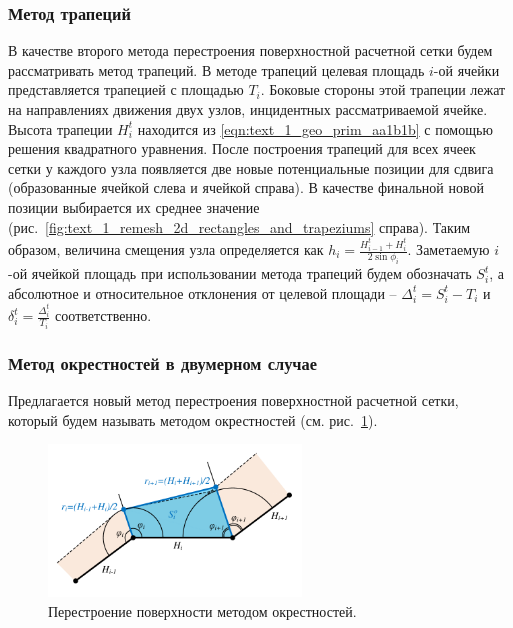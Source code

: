 \subsubsection{Метод трапеций}

В качестве второго метода перестроения поверхностной расчетной сетки будем рассматривать метод трапеций.
В методе трапеций целевая площадь $i$-ой ячейки представляется трапецией с площадью $T_i$.
Боковые стороны этой трапеции лежат на направлениях движения двух узлов, инцидентных рассматриваемой ячейке.
Высота трапеции $H_i^t$ находится из \eqref{eqn:text_1_geo_prim_aa1b1b} с помощью решения квадратного уравнения.
После построения трапеций для всех ячеек сетки у каждого узла появляется две новые потенциальные позиции для сдвига (образованные ячейкой слева и ячейкой справа).
В качестве финальной новой позиции выбирается их среднее значение (рис.~\ref{fig:text_1_remesh_2d_rectangles_and_trapeziums} справа).
Таким образом, величина смещения узла определяется как $h_i = \frac{H_{i - 1}^t + H_i^t}{2 \sin \phi_i}$.
Заметаемую $i$-ой ячейкой площадь при использовании метода трапеций будем обозначать $S_i^t$, а абсолютное и относительное отклонения от целевой площади -- $\Delta_i^t = S_i^t - T_i$ и $\delta_i^t = \frac{\Delta_i^t}{T_i}$ соответственно.

\subsubsection{Метод окрестностей в двумерном случае}\label{sec:2dr_okrestnost_method}

Предлагается новый метод перестроения поверхностной расчетной сетки, который будем называть методом окрестностей (см. рис.~\ref{fig:text_1_remesh_2d_okrestnost}).

\begin{figure}[ht]
\centering
\includegraphics[width=0.6\textwidth]{fig/2dr_remesh_okrestnost.pdf}
\singlespacing
{}\caption{Перестроение поверхности методом окрестностей.}
\label{fig:text_1_remesh_2d_okrestnost}
\end{figure}

